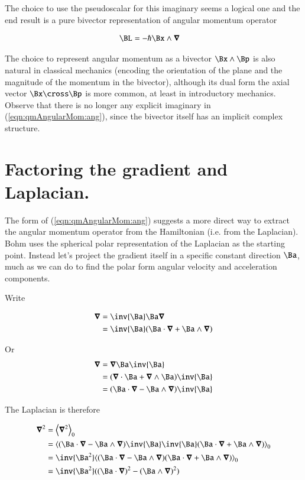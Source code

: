 The choice to use the pseudoscalar for this imaginary seems a logical one and the end result is a pure bivector representation of angular momentum operator

\begin{align}\label{eqn:qmAngularMom:ang}
\BL &= - \hbar \Bx \wedge \spacegrad
\end{align}

The choice to represent angular momentum as a bivector $\Bx \wedge \Bp$ is also natural in classical mechanics (encoding the orientation of the plane and the magnitude of the momentum in the bivector), although its dual form the axial vector $\Bx \cross \Bp$ is more common, at least in introductory mechanics.  Observe that there is no longer any explicit imaginary in (\ref{eqn:qmAngularMom:ang}), since the bivector itself has an implicit complex structure.

\section{Factoring the gradient and Laplacian.}

The form of (\ref{eqn:qmAngularMom:ang}) suggests a more direct way to extract the angular momentum operator from the Hamiltonian (i.e. from the Laplacian).  Bohm uses the spherical polar representation of the Laplacian as the starting point.  Instead let's project the gradient itself in a specific constant direction $\Ba$, much as we can do to find the polar form angular velocity and acceleration components.

Write 

\begin{align*}
\spacegrad 
&=
\inv{\Ba} \Ba \spacegrad \\
&=
\inv{\Ba} (\Ba \cdot \spacegrad + \Ba \wedge \spacegrad) \\
\end{align*}

Or
\begin{align*}
\spacegrad 
&=
\spacegrad \Ba \inv{\Ba} \\
&=
(\spacegrad \cdot \Ba + \spacegrad \wedge \Ba) \inv{\Ba} \\
&=
(\Ba \cdot \spacegrad - \Ba \wedge \spacegrad) \inv{\Ba} \\
\end{align*}

The Laplacian is therefore

\begin{align*}
\spacegrad^2 
&=
\gpgradezero{ \spacegrad^2 } \\
&=
\gpgradezero{ 
(\Ba \cdot \spacegrad - \Ba \wedge \spacegrad) \inv{\Ba} \inv{\Ba} (\Ba \cdot \spacegrad + \Ba \wedge \spacegrad) 
} \\
&=
\inv{\Ba^2} \gpgradezero{ 
(\Ba \cdot \spacegrad - \Ba \wedge \spacegrad) (\Ba \cdot \spacegrad + \Ba \wedge \spacegrad) 
} \\
&=
\inv{\Ba^2} ((\Ba \cdot \spacegrad)^2 - (\Ba \wedge \spacegrad)^2 ) \\
\end{align*}

